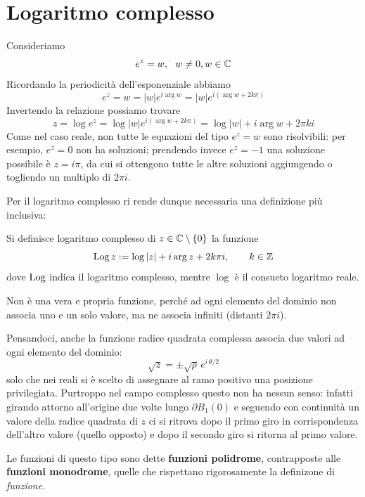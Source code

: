 \section{Logaritmo complesso}

Consideriamo
\begin{equation*}
e^{z} = w, \ \ w\neq 0, w\in \mathbb{C}
\end{equation*}
Ricordando la periodicità dell'esponenziale abbiamo
\begin{equation*}
e^{z} = w = |w| e^{i\arg w}= |w| e^{i(\arg w+2k\pi)}
\end{equation*}
Invertendo la relazione possiamo trovare
\begin{equation*}
z=\log e^z=\log |w| e^{i(\arg w+2k\pi)}=\log|w|+i\arg w+2\pi k i
\end{equation*}
Come nel caso reale, non tutte le equazioni del tipo $e^z=w$ sono risolvibili: per esempio, $e^z=0$ non ha soluzioni; prendendo invece $e^z=-1$ una soluzione possibile è $z=i\pi$, da cui si ottengono tutte le altre soluzioni aggiungendo o togliendo un multiplo di $2\pi i$.

Per il logaritmo complesso ri rende dunque necessaria una definizione più inclusiva:
\begin{defn}
Si definisce logaritmo complesso di $z\in\mathbb{C}\setminus\{0\}$ la funzione
\begin{equation*}
\operatorname{Log} z:=\log|z|+i\arg z+2k\pi i,\qquad  k\in \mathbb{Z}
\end{equation*}
dove $\operatorname{Log}$ indica il logaritmo complesso, mentre $\log$ è il consueto logaritmo reale.
\end{defn}
Non è una vera e propria funzione, perché ad ogni elemento del dominio non associa uno e un solo valore, ma ne associa infiniti (distanti $2\pi i$).

Pensandoci, anche la funzione radice quadrata complessa associa due valori ad ogni elemento del dominio:
$$
\sqrt{z}=\pm\sqrt{\rho}\,e^{i\,\theta/2}
$$
solo che nei reali si è scelto di assegnare al ramo positivo una posizione privilegiata. Purtroppo nel campo complesso questo non ha nessun senso: infatti girando attorno all'origine due volte lungo $\partial B_1(0)$ e seguendo con continuità un valore della radice quadrata di $z$ ci si ritrova dopo il primo giro in corrispondenza dell'altro valore (quello opposto) e dopo il secondo giro si ritorna al primo valore.

Le funzioni di questo tipo sono dette \textbf{funzioni polidrome}, contrapposte alle \textbf{funzioni monodrome}, quelle che rispettano rigorosamente la definizone di \textit{funzione}. 

